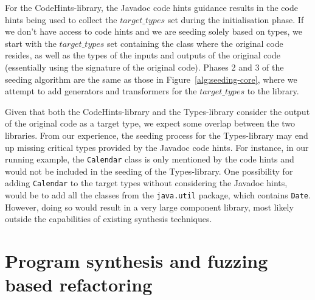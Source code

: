 \documentclass[10pt,conference]{IEEEtran}
\begin{document}
For the CodeHints-library, the Javadoc code hints guidance results in the code hints being
used to collect the $target\_types$ set during the initialisation phase.
If we don't have access to code hints and we are seeding solely
based on types, we start with the $target\_types$ set containing
the class where the original code resides, as well as the types of the inputs and outputs of the
original code (essentially using the signature of the original code).
Phases 2 and 3 of the seeding algorithm are the same as those in Figure~\ref{alg:seeding-core},
where we attempt to add generators and transformers for the $target\_types$ to the library.


Given that both the CodeHints-library and the Types-library consider the output of the
original code as a target type, we expect some overlap between the two libraries.
From our experience, the seeding process for the Types-library may end up missing critical types provided by the Javadoc code hints. For instance, in our running example, the \texttt{Calendar} class is only mentioned by the
code hints and would not be included in the seeding of the Types-library.
One possibility for adding
\texttt{Calendar} to the target types without considering
the Javadoc hints, would be to add all the classes from the
\texttt{java.util} package, which contains \texttt{Date}. However, doing so would result
in a very large component library, most likely outside the capabilities of existing
synthesis techniques.

\section{Program synthesis and fuzzing based refactoring} \label{sec:encoding}



\end{document}
